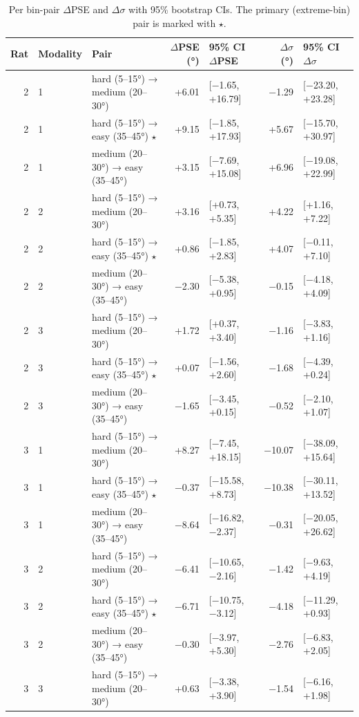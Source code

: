 \begin{table}[htbp]
  \centering
  \caption{Per bin-pair $\Delta$PSE and $\Delta\sigma$ with 95\% bootstrap CIs. The primary (extreme-bin) pair is marked with $\star$.}
  \label{tab:perceptual_bias_details}
  \begin{tabular}{rllrlrl}
    \toprule
    Rat & Modality & Pair & $\Delta$PSE (°) & 95\% CI $\Delta$PSE & $\Delta\sigma$ (°) & 95\% CI $\Delta\sigma$ \\
    \midrule
    2 & 1 & hard (5–15°) → medium (20–30°) & +6.01 & [−1.65, +16.79] & −1.29 & [−23.20, +23.28] \\
    2 & 1 & hard (5–15°) → easy (35–45°) $\star$ & +9.15 & [−1.85, +17.93] & +5.67 & [−15.70, +30.97] \\
    2 & 1 & medium (20–30°) → easy (35–45°) & +3.15 & [−7.69, +15.08] & +6.96 & [−19.08, +22.99] \\
    2 & 2 & hard (5–15°) → medium (20–30°) & +3.16 & [+0.73, +5.35] & +4.22 & [+1.16, +7.22] \\
    2 & 2 & hard (5–15°) → easy (35–45°) $\star$ & +0.86 & [−1.85, +2.83] & +4.07 & [−0.11, +7.10] \\
    2 & 2 & medium (20–30°) → easy (35–45°) & −2.30 & [−5.38, +0.95] & −0.15 & [−4.18, +4.09] \\
    2 & 3 & hard (5–15°) → medium (20–30°) & +1.72 & [+0.37, +3.40] & −1.16 & [−3.83, +1.16] \\
    2 & 3 & hard (5–15°) → easy (35–45°) $\star$ & +0.07 & [−1.56, +2.60] & −1.68 & [−4.39, +0.24] \\
    2 & 3 & medium (20–30°) → easy (35–45°) & −1.65 & [−3.45, +0.15] & −0.52 & [−2.10, +1.07] \\
    3 & 1 & hard (5–15°) → medium (20–30°) & +8.27 & [−7.45, +18.15] & −10.07 & [−38.09, +15.64] \\
    3 & 1 & hard (5–15°) → easy (35–45°) $\star$ & −0.37 & [−15.58, +8.73] & −10.38 & [−30.11, +13.52] \\
    3 & 1 & medium (20–30°) → easy (35–45°) & −8.64 & [−16.82, −2.37] & −0.31 & [−20.05, +26.62] \\
    3 & 2 & hard (5–15°) → medium (20–30°) & −6.41 & [−10.65, −2.16] & −1.42 & [−9.63, +4.19] \\
    3 & 2 & hard (5–15°) → easy (35–45°) $\star$ & −6.71 & [−10.75, −3.12] & −4.18 & [−11.29, +0.93] \\
    3 & 2 & medium (20–30°) → easy (35–45°) & −0.30 & [−3.97, +5.30] & −2.76 & [−6.83, +2.05] \\
    3 & 3 & hard (5–15°) → medium (20–30°) & +0.63 & [−3.38, +3.90] & −1.54 & [−6.16, +1.98] \\

\end{tabular}
\end{table}
